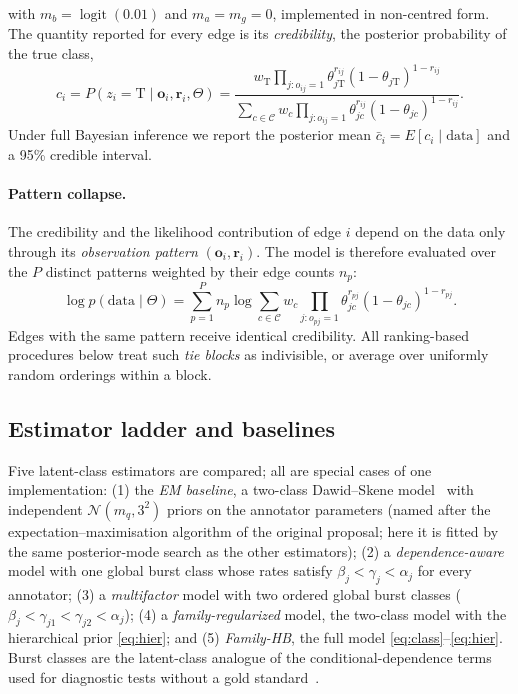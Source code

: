 with $m_b=\operatorname{logit}(0.01)$ and $m_a=m_g=0$, implemented in non-centred form.
The quantity reported for every edge is its \emph{credibility}, the posterior probability of the true class,
\begin{equation}
  c_i=P(z_i=\mathrm{T}\mid \mathbf{o}_i,\mathbf{r}_i,\Theta)=
  \frac{w_{\mathrm{T}}\prod_{j:o_{ij}=1}\theta_{j\mathrm{T}}^{r_{ij}}(1-\theta_{j\mathrm{T}})^{1-r_{ij}}}
       {\sum_{c\in\mathcal{C}} w_c\prod_{j:o_{ij}=1}\theta_{jc}^{r_{ij}}(1-\theta_{jc})^{1-r_{ij}}}.
  \label{eq:credibility}
\end{equation}
Under full Bayesian inference we report the posterior mean $\bar c_i=E[c_i\mid\text{data}]$ and a 95\% credible interval.

\paragraph{Pattern collapse.}
The credibility and the likelihood contribution of edge $i$ depend on the data only through its \emph{observation pattern} $(\mathbf{o}_i,\mathbf{r}_i)$. The model is therefore evaluated over the $P$ distinct patterns weighted by their edge counts $n_p$:
\begin{equation}
  \log p(\text{data}\mid\Theta)=\sum_{p=1}^{P} n_p \log\sum_{c\in\mathcal{C}} w_c \prod_{j:o_{pj}=1}\theta_{jc}^{r_{pj}}(1-\theta_{jc})^{1-r_{pj}}.
  \label{eq:collapsed}
\end{equation}
Edges with the same pattern receive identical credibility. All ranking-based procedures below treat such \emph{tie blocks} as indivisible, or average over uniformly random orderings within a block.

\subsection{Estimator ladder and baselines}\label{sec:ladder}
Five latent-class estimators are compared; all are special cases of one implementation:
(1) the \emph{EM baseline}, a two-class Dawid--Skene model~\citep{dawid1979maximum} with independent $\mathcal{N}(m_q,3^2)$ priors on the annotator parameters (named after the expectation--maximisation algorithm of the original proposal; here it is fitted by the same posterior-mode search as the other estimators);
(2) a \emph{dependence-aware} model with one global burst class whose rates satisfy $\beta_j<\gamma_j<\alpha_j$ for every annotator;
(3) a \emph{multifactor} model with two ordered global burst classes ($\beta_j<\gamma_{j1}<\gamma_{j2}<\alpha_j$);
(4) a \emph{family-regularized} model, the two-class model with the hierarchical prior \eqref{eq:hier}; and
(5) \emph{Family-HB}, the full model \eqref{eq:class}--\eqref{eq:hier}.
Burst classes are the latent-class analogue of the conditional-dependence terms used for diagnostic tests without a gold standard~\citep{qu1996random,dendukuri2001bayesian,albert2004cautionary}.

